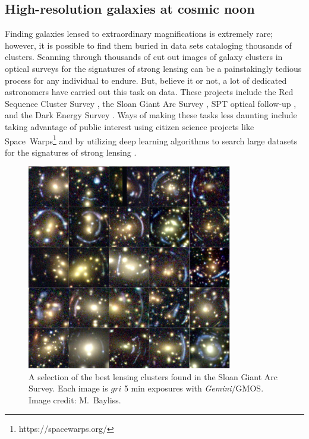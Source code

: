 \subsection{High-resolution galaxies at cosmic noon}

Finding galaxies lensed to extraordinary magnifications is extremely rare; however, it is possible to find them buried in data sets cataloging thousands of clusters. Scanning through thousands of cut out images of galaxy clusters in optical surveys for the signatures of strong lensing can be a painstakingly tedious process for any individual to endure. But, believe it or not, a lot of dedicated astronomers have carried out this task on data. These projects include the Red Sequence Cluster Survey \citep[RCS;][]{Gladders:2003zr}, the Sloan Giant Arc Survey \citep[SGAS; Gladders~et~al. in preparation, ][see Figure~\ref{intro:fig:gallery}]{Hennawi:2008mz}, SPT optical follow-up \citep{Bleem:2015gf}, and the Dark Energy Survey \citep[DES; ][]{Diehl:2017zh}. Ways of making these tasks less daunting include taking advantage of public interest using citizen science projects like Space~Warps\footnote{https://spacewarps.org/} and by utilizing deep learning algorithms to search large datasets for the signatures of strong lensing \citep{Lanusse:2018zv,Nord:2016kc}.

\begin{figure}
\centering
\includegraphics[width=0.8\textwidth]{Intro/gallery.png}
\caption[Gallery of lensing galaxy clusters discovered in SGAS]{A selection of the best lensing clusters found in the Sloan Giant Arc Survey. Each image is $gri$ 5 min exposures with {\it Gemini}/GMOS. Image credit: M.~Bayliss.}
\label{intro:fig:gallery}
\end{figure}

